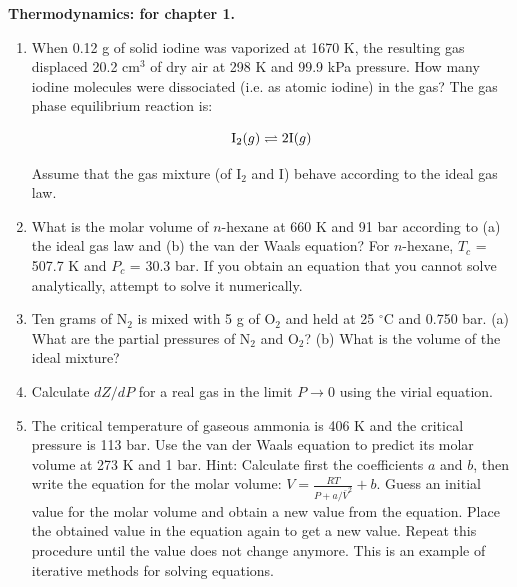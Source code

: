 \noindent
\textbf{Thermodynamics:
 for chapter 1.}\\

\begin{enumerate}
\item When 0.12 g of solid iodine was vaporized at 1670 K, the resulting gas displaced 20.2 cm$^3$ of dry air at 298 K and 99.9 kPa pressure. How many iodine molecules were dissociated (i.e. as atomic iodine) in the gas? The gas phase equilibrium reaction is:

$$\textnormal{I}_2(g) \rightleftharpoons 2\textnormal{I}(g)$$

Assume that the gas mixture (of I$_2$ and I) behave according to the ideal gas law.


\item What is the molar volume of $n$-hexane at 660 K and 91 bar according to (a) the ideal gas law and (b) the van der Waals equation? For $n$-hexane, $T_c$ = 507.7 K and $P_c$ = 30.3 bar. If you obtain an equation that you cannot solve analytically, attempt to solve it
numerically.


\item Ten grams of N$_2$ is mixed with 5 g of O$_2$ and held at 25 $^\circ$C and 0.750 bar. (a) What are the partial pressures of N$_2$ and O$_2$? (b) What is the volume of the ideal mixture?


\item Calculate $dZ / dP$ for a real gas in the limit $P \rightarrow 0$ using the virial equation.


\item The critical temperature of gaseous ammonia is 406 K and the critical pressure is 113 bar. Use the van der Waals equation to predict its molar volume at 273 K and 1 bar. Hint: Calculate first the coefficients $a$ and $b$, then write the equation for the molar
volume: $V = \frac{RT}{P + a / \bar{V}^2} + b$. Guess an initial value for the molar volume and obtain a new value from the equation. Place the obtained value in the equation again to get a new value. Repeat this procedure until the value does not change anymore. This is an example of iterative methods for solving equations.


\end{enumerate}
